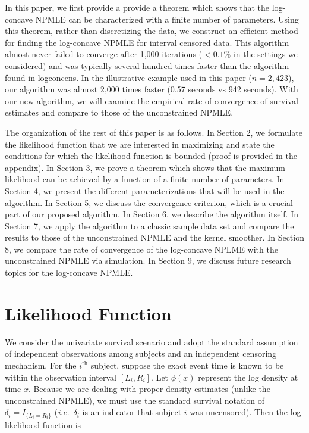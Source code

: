 	In this paper, we first provide a  provide a theorem which shows that the log-concave NPMLE can be characterized with a finite number of parameters. Using this theorem, rather than discretizing the data, we construct an efficient method for finding the log-concave NPMLE for interval censored data. This algorithm almost never failed to converge after 1,000 iterations ($< 0.1\%$ in the settings we considered) and was typically several hundred times faster than the algorithm found in logconcens. In the illustrative example used in this paper ($n = 2,423$), our algorithm was almost 2,000 times faster (0.57 seconds vs 942 seconds). With our new algorithm, we will examine the empirical rate of convergence of survival estimates and compare to those of the unconstrained NPMLE. 
	
	The organization of the rest of this paper is as follows.  In Section 2, we formulate the likelihood function that we are interested in maximizing and state the conditions for which the likelihood function is bounded (proof is provided in the appendix). In Section 3, we prove a theorem which shows that the maximum likelihood can be achieved by a function of a finite number of parameters. In Section 4, we present the different parameterizations that will be used in the algorithm. In Section 5, we discuss the convergence criterion, which is a crucial part of our proposed algorithm. In Section 6, we describe the algorithm itself. In Section 7, we apply the algorithm to a classic sample data set and compare the results to those of the unconstrained NPMLE and the kernel smoother. In Section 8, we compare the rate of convergence of the log-concave NPLME with the unconstrained NPMLE via simulation. In Section 9, we discuss future research topics for the log-concave NPMLE.


\section{Likelihood Function}
\label{sec:1}

	We consider the univariate survival scenario and adopt the standard assumption of independent observations among subjects and an independent censoring mechanism. For the $i^{\mathrm{th} } $ subject, suppose the exact event time is known to be within the observation interval $[L_i, R_i]$.  Let $\phi(x)$ represent the log density at time $x$. Because we are dealing with proper density estimates (unlike the unconstrained NPMLE), we must use the standard survival notation of $\delta_i = I_{ \{ L_i = R_i \} }$ (\emph{i.e.}\ $\delta_i$ is an indicator that subject $i$ was uncensored).  Then the log likelihood function is 
	
